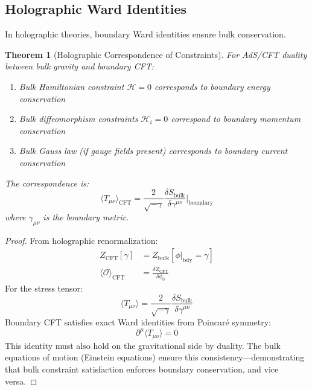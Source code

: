 \documentclass[11pt,a4paper]{article}
\newtheorem{theorem}{Theorem}[section]
\theoremstyle{remark}
\theoremstyle{definition}
\begin{document}
\subsection{Holographic Ward Identities}

In holographic theories, boundary Ward identities ensure bulk conservation.

\begin{theorem}[Holographic Correspondence of Constraints]
\label{thm:holographic_constraints}
For AdS/CFT duality between bulk gravity and boundary CFT:
\begin{enumerate}[label=(\roman*)]
\item Bulk Hamiltonian constraint $\mathcal{H} = 0$ corresponds to boundary energy conservation
\item Bulk diffeomorphism constraints $\mathcal{H}_i = 0$ correspond to boundary momentum conservation
\item Bulk Gauss law (if gauge fields present) corresponds to boundary current conservation
\end{enumerate}
The correspondence is:
\begin{equation}
\langle T_{\mu\nu} \rangle_{\text{CFT}} = \frac{2}{\sqrt{-\gamma}} \frac{\delta S_{\text{bulk}}}{\delta \gamma^{\mu\nu}}\bigg|_{\text{boundary}}
\end{equation}
where $\gamma_{\mu\nu}$ is the boundary metric.
\end{theorem}

\begin{proof}
From holographic renormalization:
\begin{align}
Z_{\text{CFT}}[\gamma] &= Z_{\text{bulk}}[\phi|_{\text{bdy}} = \gamma] \\
\langle \mathcal{O} \rangle_{\text{CFT}} &= \frac{\delta Z_{\text{CFT}}}{\delta \phi_0}
\end{align}
For the stress tensor:
\begin{equation}
\langle T_{\mu\nu} \rangle = \frac{2}{\sqrt{-\gamma}} \frac{\delta S_{\text{bulk}}}{\delta \gamma^{\mu\nu}}
\end{equation}
Boundary CFT satisfies exact Ward identities from Poincaré symmetry:
\begin{equation}
\partial^\mu \langle T_{\mu\nu} \rangle = 0
\end{equation}
This identity must also hold on the gravitational side by duality. The bulk equations of motion (Einstein equations) ensure this consistency—demonstrating that bulk constraint satisfaction enforces boundary conservation, and vice versa.
\end{proof}
\end{document}
